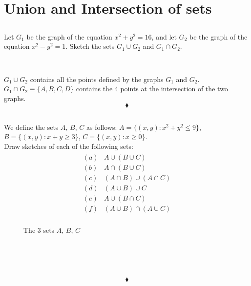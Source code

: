 \section{Union and Intersection of sets}
\subsection{}
\begin{tcolorbox}
Let $G_1$ be the graph of the equation $x^2+y^2=16$, and let $G_2$ be the graph of the equation $x^2-y^2=1$. Sketch the sets $G_1\cup G_2$ and $G_1\cap G_2$.
\end{tcolorbox}
\begin{figure}[H]%
    \centering
\\
\label{fig:fig_p8a}
\end{figure}
$G_1\cup G_2$ contains all the points defined by the graphs $G_1$ and $G_2$. 
$G_1\cap G_2\equiv \{A,B,C,D\}$ contains the 4 points at the intersection of the two graphs.
$$\blacklozenge$$
\newpage
\subsection{}
\begin{tcolorbox}
We define the sets $A,\, B,\,C$ as follows: $A=\{(x,y):x^2+y^2\le 9\}$, $ B=\{(x,y):x+y\ge 3\}$, $C=\{(x,y):x\ge 0\}$.\\Draw sketches of each of the following sets:
\begin{align*}
\begin{array}{ll}
(a)&A\cup (B\cup C)\\
(b)&A\cap (B\cup C)\\
(c)&(A\cap B)\cup (A\cap C)\\
(d)&(A\cup B)\cup C\\
(e)&A\cup (B\cap C)\\
(f)&(A\cup B)\cap (A\cup C)\\
\end{array}
\end{align*}
\end{tcolorbox}
\begin{figure}[H]%
    \centering
    
\caption{The 3 sets $A,\,B,\, C$}
\label{fig:fig_p8b}
\end{figure}
\begin{figure}[H]%
    \centering
    \\
    \\
    \\
\label{fig:fig_p8b}
\end{figure}
$$\blacklozenge$$
